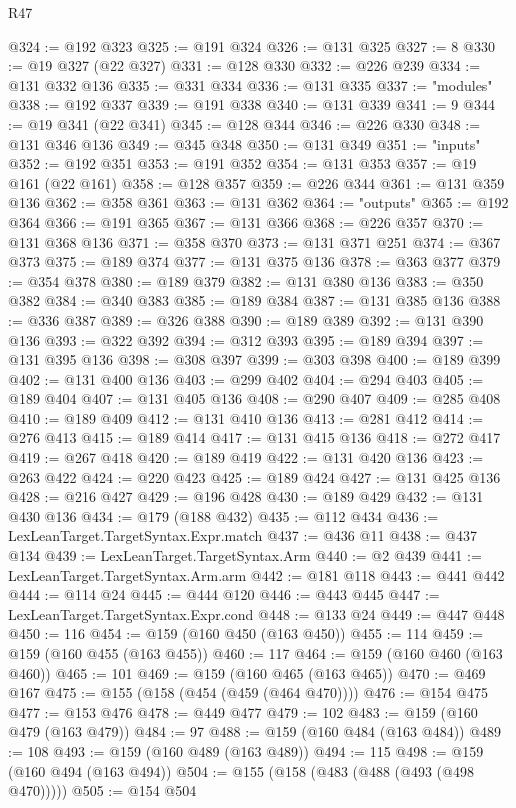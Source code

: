 \begin{lexlean}{R47}
\begin{coremodule}
@324 := @192 @323
@325 := @191 @324
@326 := @131 @325
@327 := 8
@330 := @19 @327 (@22 @327)
@331 := @128 @330
@332 := @226 @239
@334 := @131 @332 @136
@335 := @331 @334
@336 := @131 @335
@337 := "modules"
@338 := @192 @337
@339 := @191 @338
@340 := @131 @339
@341 := 9
@344 := @19 @341 (@22 @341)
@345 := @128 @344
@346 := @226 @330
@348 := @131 @346 @136
@349 := @345 @348
@350 := @131 @349
@351 := "inputs"
@352 := @192 @351
@353 := @191 @352
@354 := @131 @353
@357 := @19 @161 (@22 @161)
@358 := @128 @357
@359 := @226 @344
@361 := @131 @359 @136
@362 := @358 @361
@363 := @131 @362
@364 := "outputs"
@365 := @192 @364
@366 := @191 @365
@367 := @131 @366
@368 := @226 @357
@370 := @131 @368 @136
@371 := @358 @370
@373 := @131 @371 @251
@374 := @367 @373
@375 := @189 @374
@377 := @131 @375 @136
@378 := @363 @377
@379 := @354 @378
@380 := @189 @379
@382 := @131 @380 @136
@383 := @350 @382
@384 := @340 @383
@385 := @189 @384
@387 := @131 @385 @136
@388 := @336 @387
@389 := @326 @388
@390 := @189 @389
@392 := @131 @390 @136
@393 := @322 @392
@394 := @312 @393
@395 := @189 @394
@397 := @131 @395 @136
@398 := @308 @397
@399 := @303 @398
@400 := @189 @399
@402 := @131 @400 @136
@403 := @299 @402
@404 := @294 @403
@405 := @189 @404
@407 := @131 @405 @136
@408 := @290 @407
@409 := @285 @408
@410 := @189 @409
@412 := @131 @410 @136
@413 := @281 @412
@414 := @276 @413
@415 := @189 @414
@417 := @131 @415 @136
@418 := @272 @417
@419 := @267 @418
@420 := @189 @419
@422 := @131 @420 @136
@423 := @263 @422
@424 := @220 @423
@425 := @189 @424
@427 := @131 @425 @136
@428 := @216 @427
@429 := @196 @428
@430 := @189 @429
@432 := @131 @430 @136
@434 := @179 (@188 @432)
@435 := @112 @434
@436 := LexLeanTarget.TargetSyntax.Expr.match
@437 := @436 @11
@438 := @437 @134
@439 := LexLeanTarget.TargetSyntax.Arm
@440 := @2 @439
@441 := LexLeanTarget.TargetSyntax.Arm.arm
@442 := @181 @118
@443 := @441 @442
@444 := @114 @24
@445 := @444 @120
@446 := @443 @445
@447 := LexLeanTarget.TargetSyntax.Expr.cond
@448 := @133 @24
@449 := @447 @448
@450 := 116
@454 := @159 (@160 @450 (@163 @450))
@455 := 114
@459 := @159 (@160 @455 (@163 @455))
@460 := 117
@464 := @159 (@160 @460 (@163 @460))
@465 := 101
@469 := @159 (@160 @465 (@163 @465))
@470 := @469 @167
@475 := @155 (@158 (@454 (@459 (@464 @470))))
@476 := @154 @475
@477 := @153 @476
@478 := @449 @477
@479 := 102
@483 := @159 (@160 @479 (@163 @479))
@484 := 97
@488 := @159 (@160 @484 (@163 @484))
@489 := 108
@493 := @159 (@160 @489 (@163 @489))
@494 := 115
@498 := @159 (@160 @494 (@163 @494))
@504 := @155 (@158 (@483 (@488 (@493 (@498 @470)))))
@505 := @154 @504

\end{coremodule}
\end{lexlean}
